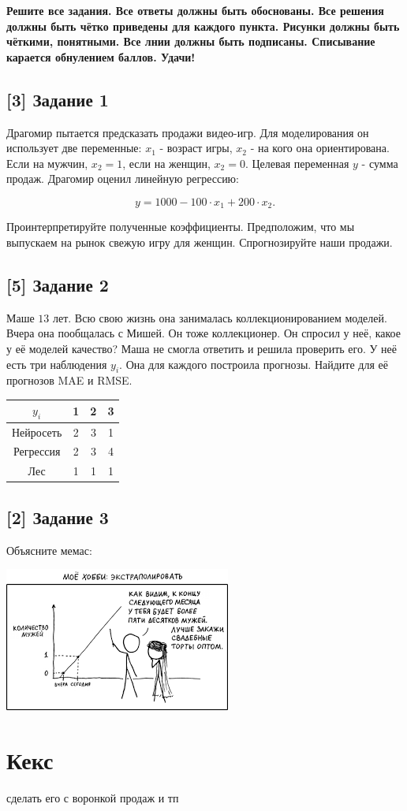 \documentclass[12pt, a4paper, oneside]{article}
\begin{document}
\textbf{Решите все задания. Все ответы должны быть обоснованы. Все решения должны быть чётко приведены для каждого пункта. Рисунки должны быть чёткими, понятными. Все лнии должны быть подписаны. Списывание карается обнулением баллов. Удачи!}

\subsection*{[3] Задание 1 }

Драгомир пытается предсказать продажи видео-игр.  Для моделирования он использует две переменные: $x_1$ - возраст игры, $x_2$ - на кого она ориентирована. Если на мужчин, $x_2=1$, если на женщин, $x_2=0$. Целевая переменная $y$ - сумма продаж. Драгомир оценил линейную регрессию: 

$$ y = 1000 - 100 \cdot  x_1 + 200 \cdot  x_2.$$

Проинтерпретируйте полученные коэффициенты.  Предположим, что мы выпускаем на рынок свежую игру для женщин. Спрогнозируйте наши продажи. 


\subsection*{[5] Задание 2}

Маше $13$ лет. Всю свою жизнь она занималась коллекционированием моделей.  Вчера она пообщалась с Мишей. Он тоже коллекционер. Он спросил у неё, какое у её моделей качество? Маша не смогла ответить и решила проверить его. У неё есть три наблюдения $y_i$. Она для каждого построила прогнозы. Найдите для её прогнозов MAE и RMSE.

\begin{center}
	\begin{tabular}{c|c|c|c}
		$y_i$ &  1 & 2 & 3 \\
		\hline
		Нейросеть & 2 & 3 & 1  \\
		Регрессия &  2 & 3 & 4 \\
		Лес & 1 & 1 & 1 \\
	\end{tabular}
\end{center}


\subsection*{[2] Задание 3}

Объясните мемас: 

\begin{center}
	\includegraphics[scale=0.7]{memes.png}
\end{center}


\newpage 


\section*{Кекс}


сделать его с воронкой продаж и тп 
\end{document}
